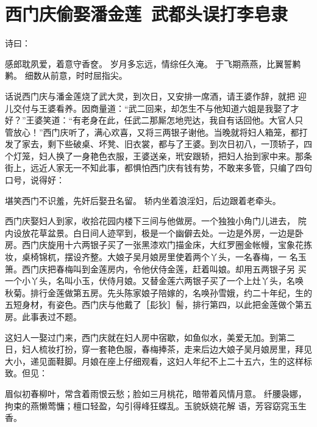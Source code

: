 \chapter{西门庆偷娶潘金莲~武都头误打李皂隶}

诗曰：

感郎耽夙爱，着意守香奁。
岁月多忘远，情综任久淹。
于飞期燕燕，比翼誓鹣鹣。
细数从前意，时时屈指尖。

话说西门庆与潘金莲烧了武大灵，到次日，又安排一席酒，请王婆作辞，就把
迎儿交付与王婆看养。因商量道：“武二回来，却怎生不与他知道六姐是我娶了才
好？”王婆笑道：“有老身在此，任武二那厮怎地兜达，我自有话回他。大官人只
管放心！”西门庆听了，满心欢喜，又将三两银子谢他。当晚就将妇人箱笼，都打
发了家去，剩下些破桌、坏凳、旧衣裳，都与了王婆。到次日初八，一顶轿子，四
个灯笼，妇人换了一身艳色衣服，王婆送亲，玳安跟轿，把妇人抬到家中来。那条
街上，远近人家无一不知此事，都惧怕西门庆有钱有势，不敢来多管，只编了四句
口号，说得好：

堪笑西门不识羞，先奸后娶丑名留。
轿内坐着浪淫妇，后边跟着老牵头。

西门庆娶妇人到家，收拾花园内楼下三间与他做房。一个独独小角门儿进去，
院内设放花草盆景。白日间人迹罕到，极是一个幽僻去处。一边是外房，一边是卧
房。西门庆旋用十六两银子买了一张黑漆欢门描金床，大红罗圈金帐幔，宝象花拣
妆，桌椅锦杌，摆设齐整。大娘子吴月娘房里使着两个丫头，一名春梅，一
名玉箫。西门庆把春梅叫到金莲房内，令他伏侍金莲，赶着叫娘。却用五两银子另
买一个小丫头，名叫小玉，伏侍月娘。又替金莲六两银子买了一个上灶丫头，名唤
秋菊。排行金莲做第五房。先头陈家娘子陪嫁的，名唤孙雪娥，约二十年纪，生的
五短身材，有姿色。西门庆与他戴了［髟狄］髻，排行第四，以此把金莲做个第五
房。此事表过不题。

这妇人一娶过门来，西门庆就在妇人房中宿歇，如鱼似水，美爱无加。到第二
日，妇人梳妆打扮，穿一套艳色服，春梅捧茶，走来后边大娘子吴月娘房里，拜见
大小，递见面鞋脚。月娘在座上仔细观看，这妇人年纪不上二十五六，生的这样标
致。但见：

眉似初春柳叶，常含着雨恨云愁；脸如三月桃花，暗带着风情月意。
纤腰袅娜，拘束的燕懒莺慵；檀口轻盈，勾引得峰狂蝶乱。玉貌妖娆花解
语，芳容窈窕玉生香。

